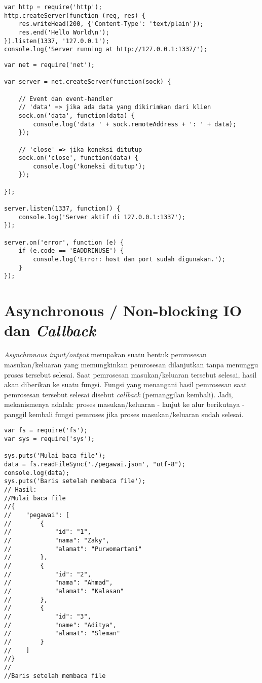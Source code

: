 \lstset{language=JavaScript,caption=server.js}
\begin{lstlisting}
var http = require('http');
http.createServer(function (req, res) {
	res.writeHead(200, {'Content-Type': 'text/plain'});
	res.end('Hello World\n');
}).listen(1337, '127.0.0.1');
console.log('Server running at http://127.0.0.1:1337/');
\end{lstlisting}

\lstset{language=JavaScript,caption=server-on-error.js}
\begin{lstlisting}
var net = require('net');

var server = net.createServer(function(sock) {

	// Event dan event-handler
	// 'data' => jika ada data yang dikirimkan dari klien
	sock.on('data', function(data) {
		console.log('data ' + sock.remoteAddress + ': ' + data);
	});

	// 'close' => jika koneksi ditutup
	sock.on('close', function(data) {
		console.log('koneksi ditutup');
	});

});

server.listen(1337, function() {
	console.log('Server aktif di 127.0.0.1:1337');
});

server.on('error', function (e) {
	if (e.code == 'EADDRINUSE') {
		console.log('Error: host dan port sudah digunakan.');
	}
});
\end{lstlisting}

\section{Asynchronous / Non-blocking IO dan \textit{Callback}}

\textit{Asynchronous input/output} merupakan suatu bentuk pemrosesan masukan/keluaran yang memungkinkan pemrosesan dilanjutkan tanpa menunggu proses tersebut selesai. Saat pemrosesan masukan/keluaran tersebut selesai, hasil akan diberikan ke suatu fungsi. Fungsi yang menangani hasil pemrosesan saat pemrosesan tersebut selesai disebut \textit{callback} (pemanggilan kembali). Jadi, mekanismenya adalah: proses masukan/keluaran - lanjut ke alur berikutnya - panggil kembali fungsi pemroses jika proses masukan/keluaran sudah selesai.

\lstset{language=JavaScript,caption=Membaca file secara synchronous}
\begin{lstlisting}
var fs = require('fs');
var sys = require('sys');

sys.puts('Mulai baca file');
data = fs.readFileSync('./pegawai.json', "utf-8");
console.log(data);
sys.puts('Baris setelah membaca file');
// Hasil:
//Mulai baca file
//{
//    "pegawai": [
//        {
//            "id": "1",
//            "nama": "Zaky",
//            "alamat": "Purwomartani"
//        },
//        {
//            "id": "2",
//            "nama": "Ahmad",
//            "alamat": "Kalasan"
//        },
//        {
//            "id": "3",
//            "name": "Aditya",
//            "alamat": "Sleman"
//        }
//    ]
//}
//
//Baris setelah membaca file
\end{lstlisting}

